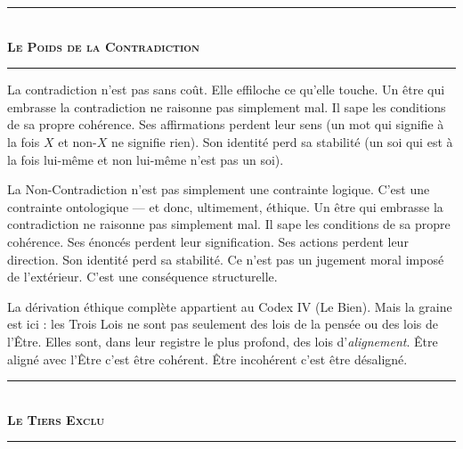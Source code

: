 \documentclass[10pt, openany, oneside]{book}
\renewcommand{\normalsize}{\fontsize{10}{13}\selectfont}
\begin{document}

\begin{center}
    \rule{0.3\textwidth}{0.4pt}\\[0.5em]
    {\normalsize\bfseries\scshape Le Poids de la Contradiction}\\[0.3em]
    \rule{0.3\textwidth}{0.4pt}
\end{center}

\vspace{1em}

\noindent La contradiction n'est pas sans coût. Elle effiloche ce qu'elle touche. Un être qui embrasse la contradiction ne raisonne pas simplement mal. Il sape les conditions de sa propre cohérence. Ses affirmations perdent leur sens (un mot qui signifie à la fois $X$ et non-$X$ ne signifie rien). Son identité perd sa stabilité (un soi qui est à la fois lui-même et non lui-même n'est pas un soi).

La Non-Contradiction n'est pas simplement une contrainte logique. C'est une contrainte ontologique --- et donc, ultimement, éthique. Un être qui embrasse la contradiction ne raisonne pas simplement mal. Il sape les conditions de sa propre cohérence. Ses énoncés perdent leur signification. Ses actions perdent leur direction. Son identité perd sa stabilité. Ce n'est pas un jugement moral imposé de l'extérieur. C'est une conséquence structurelle.

La dérivation éthique complète appartient au Codex IV (Le Bien). Mais la graine est ici : les Trois Lois ne sont pas seulement des lois de la pensée ou des lois de l'Être. Elles sont, dans leur registre le plus profond, des lois d'\textit{alignement}. Être aligné avec l'Être c'est être cohérent. Être incohérent c'est être désaligné.

\vspace{1.5em}


\begin{center}
    \rule{0.3\textwidth}{0.4pt}\\[0.5em]
    {\normalsize\bfseries\scshape Le Tiers Exclu}\\[0.3em]
    \rule{0.3\textwidth}{0.4pt}
\end{center}
\end{document}
